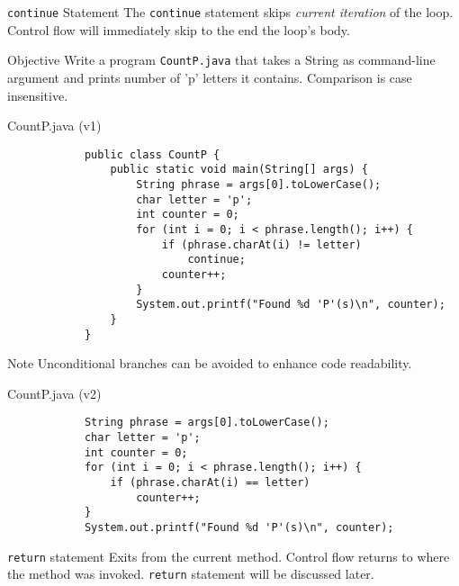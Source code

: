 \documentclass[10pt, compress]{beamer}
\begin{document}
\begin{slide}
	\begin{block}{\texttt{continue} Statement}
		The \texttt{continue} statement skips \emph{current iteration} of the loop.
		Control flow will immediately skip to the end the loop's body.
	\end{block}
\end{slide}

\begin{slide}
	\begin{block}{Objective}
		Write a program \texttt{CountP.java} that takes a String as command-line argument and prints number of 'p' letters it contains. Comparison is case insensitive.
	\end{block}
\end{slide}

\begin{slide}
	\begin{block}{CountP.java (v1)}
		\begin{verbatim}
			public class CountP {
			    public static void main(String[] args) {
			        String phrase = args[0].toLowerCase();
			        char letter = 'p';
			        int counter = 0;
			        for (int i = 0; i < phrase.length(); i++) {
			            if (phrase.charAt(i) != letter)
			                continue;
			            counter++;
			        }
			        System.out.printf("Found %d 'P'(s)\n", counter);
			    }
			}
		\end{verbatim}
	\end{block}
\end{slide}

\begin{slide}
	\begin{block}{Note}
	Unconditional branches can be avoided to enhance code readability.
	\end{block}
	\begin{block}{CountP.java (v2)}
		\begin{verbatim}
			String phrase = args[0].toLowerCase();
			char letter = 'p';
			int counter = 0;
			for (int i = 0; i < phrase.length(); i++) {
			    if (phrase.charAt(i) == letter)
			        counter++;
			}
			System.out.printf("Found %d 'P'(s)\n", counter);
		\end{verbatim}
	\end{block}
\end{slide}

\begin{slide}
	\begin{block}{\texttt{return} statement}
	Exits from the current method.
	Control flow returns to where the method was invoked.
	\texttt{return} statement will be discussed later.
	\end{block}
\end{slide}
\end{document}
